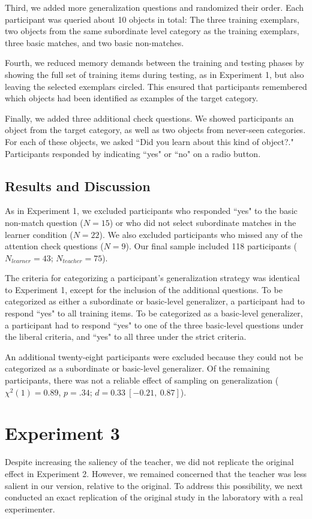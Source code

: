 \documentclass[man]{apa2}
\begin{document}
Third, we added more generalization questions and randomized their order. Each participant was queried about 10 objects in total: The three training exemplars, two objects from the same subordinate level category as the training exemplars, three basic matches, and two basic non-matches. 

Fourth, we reduced memory demands between the training and testing phases by showing the full set of training items during testing, as in Experiment 1, but also leaving the selected exemplars circled. This ensured that participants remembered which objects had been identified as examples of the target category. 

Finally, we added three additional check questions.  We showed participants an object from the target category, as well as two objects from never-seen categories. For each of these objects, we asked ``Did you learn about this kind of object?." Participants responded by indicating ``yes" or ``no" on a radio button.

\subsection{Results and Discussion}
As in Experiment 1, we excluded participants who responded ``yes" to the basic non-match question ($N=15$) or who did not select subordinate matches in the learner condition ($N = 22$). We also excluded participants who missed any of the attention check questions ($N = 9$). Our final sample  included 118 participants ($N_{learner} = 43$; $N_{teacher} = 75$).

The criteria for categorizing a participant's generalization strategy was identical to Experiment 1, except for the inclusion of the additional questions. To be categorized as either a subordinate or basic-level generalizer, a participant had to respond ``yes" to all training items. To be categorized as a basic-level generalizer, a participant had to respond ``yes" to one of the three basic-level questions under the liberal criteria, and ``yes" to all three under the strict criteria. 

An additional twenty-eight participants were excluded because they could not be categorized as a subordinate or basic-level generalizer. Of the remaining participants, there was not a reliable effect of sampling on generalization ($\chi^2(1) = 0.89$,  $p = .34$; $d = 0.33\ [-0.21,\ 0.87]$).

\section{Experiment 3}
Despite increasing the saliency of the teacher, we did not replicate the original effect in Experiment 2. However, we remained  concerned that the teacher was  less salient in our version, relative to the original. To address this possibility, we next conducted an exact replication of the original study in the laboratory with a real experimenter.
\end{document}
